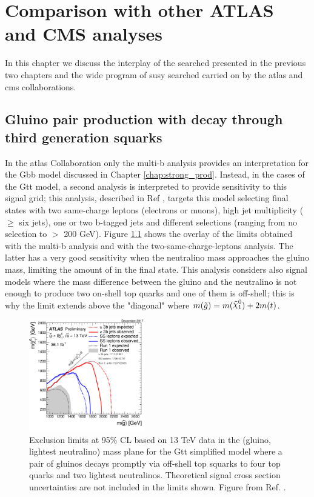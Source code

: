 \chapter{Comparison with other ATLAS and CMS analyses}
\label{chap:summary_susy}

In this chapter we discuss the interplay of the searched presented in the previous two chapters and the 
wide program of \gls{susy} searched carried on by the \gls{atlas} and \gls{cms} collaborations. 

\section{Gluino pair production with decay through third generation squarks}

In the \gls{atlas} Collaboration only the multi-b analysis provides an interpretation for the Gbb model 
discussed in Chapter \ref{chap:strong_prod}.
Instead, in the cases of the Gtt model, a second analysis is interpreted to provide sensitivity  to this 
signal grid; this analysis, described in Ref \cite{Aaboud:2017dmy}, targets this model selecting final states with two same-charge 
leptons (electrons or muons), high jet multiplicity ($\geq$ six jets), one or two b-tagged jets and different \met selections 
(ranging from no \met selection to \met $>$ 200 GeV).
Figure \ref{fig:summary_atlas_Gtt} shows the overlay of the limits obtained with the multi-b analysis and with the two-same-charge-leptons analysis.
The latter has a very good sensitivity when the neutralino mass approaches the gluino mass,
limiting the amount of \met in the final state.
This analysis considers also signal models where the mass difference between the gluino and the neutralino 
is not enough to produce two on-shell top quarks and one of them is off-shell; this is why the limit extends above 
the "diagonal" where $m(\tilde{g}) = m(\ninoone) + 2 m(t)$.

\begin{figure}[htbp]
	\centering
	\includegraphics[width=0.45\textwidth]{figures/summary_plots/ATLAS_SUSY_Gtt.pdf}
	\caption{Exclusion limits at 95\% CL based on 13 TeV data in the (gluino, lightest neutralino) 
	mass plane for the Gtt simplified model where a pair of gluinos decays promptly via off-shell top 
	squarks to four top quarks and two lightest neutralinos. Theoretical signal cross section uncertainties are 
	not included in the limits shown. Figure from Ref. \cite{atlasSUSYSummary}.
	} 
	\label{fig:summary_atlas_Gtt}
\end{figure}


